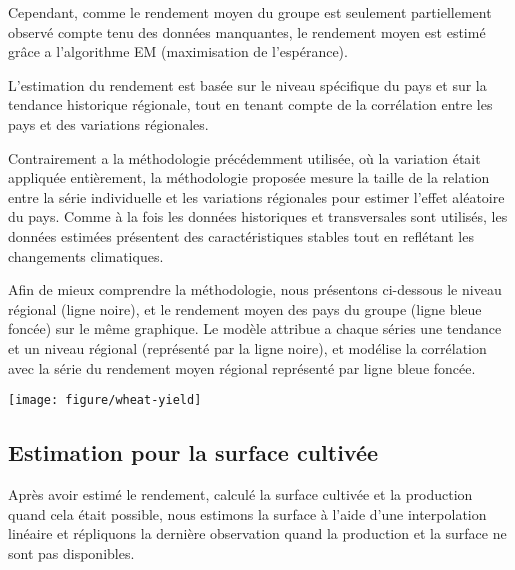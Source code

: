 \documentclass[nojss]{jss}\usepackage{graphicx, color}
\makeatletter
\def\maxwidth{ %
  \ifdim\Gin@nat@width>\linewidth
    \linewidth
  \else
    \Gin@nat@width
  \fi
}
\newenvironment{knitrout}{}{} %
\makeatother
\begin{document}
Cependant, comme le rendement moyen du groupe est seulement
partiellement observ\'{e} compte tenu des donn\'{e}es manquantes, le
rendement moyen est estim\'{e} grâce a l'algorithme EM (maximisation
de l'esp\'{e}rance).

L'estimation du rendement est bas\'{e}e sur le niveau sp\'{e}cifique
du pays et sur la tendance historique r\'{e}gionale, tout en tenant
compte de la corr\'{e}lation entre les pays et des variations
r\'{e}gionales.

Contrairement a la m\'{e}thodologie pr\'{e}c\'{e}demment utilis\'{e}e,
où la variation \'{e}tait appliqu\'{e}e enti\`{e}rement, la
m\'{e}thodologie propos\'{e}e mesure la taille de la relation entre la
s\'{e}rie individuelle et les variations r\'{e}gionales pour estimer
l'effet al\'{e}atoire du pays. Comme \`{a} la fois les donn\'{e}es
historiques et transversales sont utilis\'{e}s, les donn\'{e}es
estim\'{e}es pr\'{e}sentent des caract\'{e}ristiques stables tout en
refl\'{e}tant les changements climatiques.


Afin de mieux comprendre la m\'{e}thodologie, nous pr\'{e}sentons
ci-dessous le niveau r\'{e}gional (ligne noire), et le rendement moyen
des pays du groupe (ligne bleue fonc\'{e}e) sur le m\^{e}me graphique. Le
mod\`{e}le attribue a chaque s\'{e}ries une tendance et un niveau
r\'{e}gional (repr\'{e}sent\'{e} par la ligne noire), et mod\'{e}lise
la corr\'{e}lation avec la s\'{e}rie du rendement moyen r\'{e}gional
repr\'{e}sent\'{e} par ligne bleue fonc\'{e}e.


\begin{knitrout}
\color{fgcolor}

{\centering \texttt{[image: figure/wheat-yield]} 

}



\end{knitrout}




\subsection{Estimation pour la surface cultiv\'{e}e }

Apr\`{e}s avoir estim\'{e} le rendement, calcul\'{e} la surface
cultiv\'{e}e et la production quand cela \'{e}tait possible, nous
estimons la surface \`{a} l'aide d'une interpolation lin\'{e}aire et
r\'{e}pliquons la derni\`{e}re observation quand la production et la
surface ne sont pas disponibles.
\end{document}

